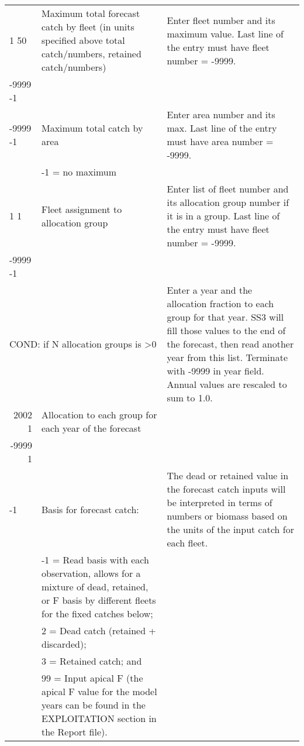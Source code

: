 \begin{landscape}
{\begin{longtable}{p{3.2cm} p{7cm} p{10.8cm}}
  \hline
  1 50 & Maximum total forecast catch by fleet (in units specified above total catch/numbers, retained catch/numbers) & \multirow{1}{1cm}[-0.25cm]{\parbox{11cm}{Enter fleet number and its maximum value. Last line of the entry must have fleet number = -9999.}} \Tstrut\\
  -9999 -1 & & \Bstrut\\
  \hline
  
  -9999 -1 & Maximum total catch by area & \multirow{1}{1cm}[-0.25cm]{\parbox{11cm}{Enter area number and its max. Last line of the entry must have area number = -9999.}} \Tstrut\\
     & -1 = no maximum & \Bstrut\\
     
  \hline
  1 1  & Fleet assignment to allocation group & \multirow{1}{1cm}[-0.25cm]{\parbox{11cm}{Enter list of fleet number and its allocation group number if it is in a group. Last line of the entry must have fleet number = -9999.}} \Tstrut\\
  -9999 -1  & &  \Bstrut\\ 
    
  \multicolumn{2}{l}{COND: if N allocation groups is >0 } & \multirow{1}{1cm}[-0.25cm]{\parbox{11cm}{ Enter a year and the allocation fraction to each group for that year.  SS3 will fill those values to the end of the forecast, then read another year from this list.  Terminate with -9999 in year field. Annual values are rescaled to sum to 1.0.}} \Tstrut \\
  \multicolumn{1}{r}{2002 1}  & Allocation to each group for each year of the forecast & \\
  \multicolumn{1}{r}{-9999 1} & & \Bstrut\\
  
  
  \hline
    -1 & Basis for forecast catch: & \multirow{1}{1cm}[-0.25cm]{\parbox{11cm}{ The dead or retained value in the forecast catch inputs will be interpreted in terms of numbers or biomass based on the units of the input catch for each fleet. }}\Tstrut\\
    & -1 = Read basis with each observation, allows for a mixture of dead, retained, or F basis by different fleets for the fixed catches below; & \\
    & 2 = Dead catch (retained + discarded); & \\
    & 3 = Retained catch; and & \\
    & 99 = Input apical F (the apical F value for the model years can be found in the EXPLOITATION section in the Report file). & \Bstrut\\
    

\end{longtable}}
\end{landscape}
